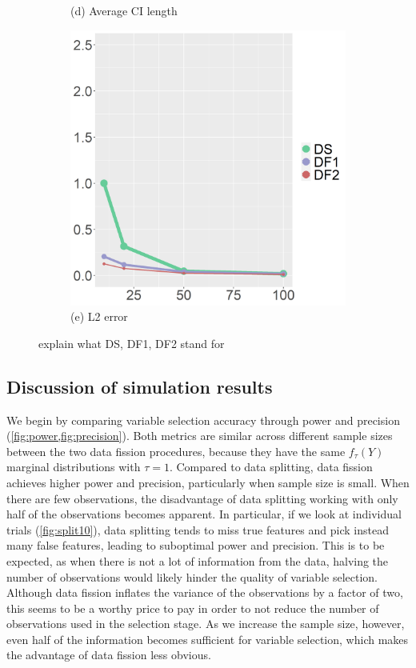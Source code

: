 \begin{figure}[ht!]
\begin{subfigure}[b]{.32\columnwidth}
    \caption{(d) Average CI length}
    \label{fig:ci}
\end{subfigure}
\hfill
\centering
\begin{subfigure}[b]{.32\columnwidth} 
    \includegraphics[width=\columnwidth]{../../plot/L2_1.png}
    \caption{(e) L2 error}
    \label{fig:l2}
\end{subfigure}
\hfill
\caption{explain what DS, DF1, DF2 stand for}
\label{fig:median}
\end{figure}

\subsection{Discussion of simulation results}

We begin by comparing variable selection accuracy through power and precision (\cref{fig:power,fig:precision}). Both metrics are similar across different sample sizes between the two data fission procedures, because they have the same $f_\tau(Y)$ marginal distributions with $\tau=1$. Compared to data splitting, data fission achieves higher power and precision, particularly when sample size is small. When there are few observations, the disadvantage of data splitting working with only half of the observations becomes apparent. In particular, if we look at individual trials (\cref{fig:split10}), data splitting tends to miss true features and pick instead many false features, leading to suboptimal power and precision. This is to be expected, as when there is not a lot of information from the data, halving the number of observations would likely hinder the quality of variable selection. Although data fission inflates the variance of the observations by a factor of two, this seems to be a worthy price to pay in order to not reduce the number of observations used in the selection stage. As we increase the sample size, however, even half of the information becomes sufficient for variable selection, which makes the advantage of data fission less obvious.

